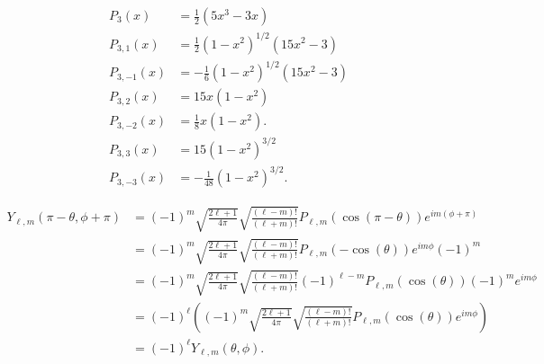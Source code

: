 \documentclass[10pt]{mypackage}
\begin{document}
\begin{solution}[35.10]
  \begin{align*}
    P_{3}\left( x \right) &= \frac{1}{2}\left( 5x^3 - 3x \right)\\
    P_{3,1}\left( x \right) &= \frac{1}{2}\left( 1-x^2 \right)^{1/2}\left( 15x^2 - 3 \right)\\
    P_{3,-1}\left( x \right) &= -\frac{1}{6}\left( 1-x^2 \right)^{1/2}\left( 15x^2 - 3 \right)\\
    P_{3,2} \left( x \right)  &= 15x\left( 1-x^2 \right)\\
    P_{3,-2}\left( x \right) &= \frac{1}{8}x\left( 1-x^2 \right).\\
    P_{3,3}\left( x \right) &= 15\left( 1-x^2 \right)^{3/2}\\
    P_{3,-3}\left( x \right) &= -\frac{1}{48}\left( 1-x^2 \right)^{3/2}.
  \end{align*}
\end{solution}
\begin{solution}[35.11]
  \begin{align*}
    Y_{\ell,m}\left( \pi-\theta,\phi + \pi \right)  &= \left( -1 \right)^{m}\sqrt{\frac{2\ell + 1}{4\pi}}\sqrt{\frac{\left( \ell-m \right)!}{\left( \ell + m \right)!}}P_{\ell,m}\left( \cos\left( \pi-\theta \right) \right)e^{im\left( \phi + \pi \right)}\\
                                                    &= \left( -1 \right)^{m}\sqrt{\frac{2\ell + 1}{4\pi}}\sqrt{\frac{\left( \ell - m \right)!}{\left( \ell + m \right)!}}P_{\ell,m}\left( -\cos\left( \theta \right) \right)e^{im\phi}\left( -1 \right)^{m}\\
                                                    &= \left( -1 \right)^{m}\sqrt{\frac{2\ell + 1}{4\pi}}\sqrt{\frac{\left( \ell - m \right)!}{\left( \ell + m \right)!}}\left( -1 \right)^{\ell -m}P_{\ell,m}\left( \cos\left( \theta \right) \right)\left( -1 \right)^{m}e^{im\phi}\\
                                                    &= \left( -1 \right)^{\ell}\left( \left( -1 \right)^{m}\sqrt{\frac{2\ell + 1}{4\pi}}\sqrt{\frac{\left( \ell - m \right)!}{\left( \ell + m \right)!}}P_{\ell,m}\left( \cos\left( \theta \right) \right)e^{im\phi} \right)\\
                                                    &= \left( -1 \right)^{\ell}Y_{\ell,m}\left( \theta,\phi \right).
  \end{align*}
  
\end{solution}
\end{document}
